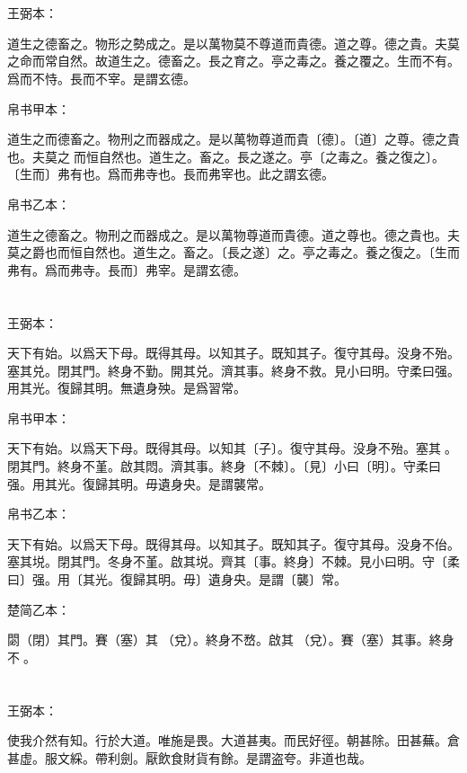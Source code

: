 \documentclass[a5paper]{ctexbook}
\begin{document}
    \chapter{}
    王弼本：

    道生之德畜之。物形之勢成之。是以萬物莫不尊道而貴德。道之尊。德之貴。夫莫之命而常自然。故道生之。德畜之。長之育之。亭之毒之。養之覆之。生而不有。爲而不恃。長而不宰。是謂玄德。

    
    帛书甲本：

    道生之而德畜之。物刑之而器成之。是以萬物尊道而貴〔德〕。〔道〕之尊。德之貴也。夫莫之𡬠而恒自然也。道生之。畜之。長之遂之。亭〔之毒之。養之復之〕。〔生而〕弗有也。爲而弗寺也。長而弗宰也。此之謂玄德。

    帛书乙本：

    道生之德畜之。物刑之而器成之。是以萬物尊道而貴德。道之尊也。德之貴也。夫莫之爵也而恒自然也。道生之。畜之。〔長之遂〕之。亭之毒之。養之復之。〔生而弗有。爲而弗寺。長而〕弗宰。是謂玄德。

    \chapter{}
    王弼本：

    天下有始。以爲天下母。既得其母。以知其子。既知其子。復守其母。没身不殆。塞其兑。閉其門。終身不勤。開其兑。濟其事。終身不救。見小曰明。守柔曰强。用其光。復歸其明。無遺身殃。是爲習常。

    
    帛书甲本：

    天下有始。以爲天下母。既得其母。以知其〔子〕。復守其母。没身不殆。塞其󱁂。閉其門。終身不堇。啟其悶。濟其事。終身〔不棘〕。〔見〕小曰〔明〕。守柔曰强。用其光。復歸其明。毋遺身央。是謂襲常。

    帛书乙本：

    天下有始。以爲天下母。既得其母。以知其子。既知其子。復守其母。没身不佁。塞其㙂。閉其門。冬身不堇。啟其㙂。齊其〔事。終身〕不棘。見小曰明。守〔柔曰〕强。用〔其光。復歸其明。毋〕遺身央。是謂〔襲〕常。

    楚简乙本：

    閟（閉）其門。賽（塞）其𨓚（兌）。終身不嵍。啟其𨓚（兌）。賽（塞）其事。終身不󶵠。

    \chapter{}
    王弼本：

    使我介然有知。行於大道。唯施是畏。大道甚夷。而民好徑。朝甚除。田甚蕪。倉甚虚。服文綵。帶利劍。厭飲食財貨有餘。是謂盗夸。非道也哉。
\end{document}
